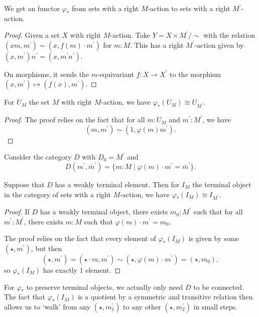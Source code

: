 \begin{lemma}\label{lem:scalar-extension}
  We get an  functor $ \varphi_* $ from sets with a right $ M $-action to sets with a right $ M^\prime $-action.
\end{lemma}
\begin{proof}
  Given a set $ X $ with right $ M $-action. Take $ Y = X \times M^\prime / \sim $ with the relation $ (x m, m^\prime) \sim (x, f(m) \cdot m^\prime) $ for $ m: M $. This has a right $ M^\prime $-action given by $ (x, m^\prime)n^\prime = (x, m^\prime n^\prime) $.

  On morphisms, it sends the $ m $-equivariant $ f: X \to X^\prime $ to the morphism $ (x, m^\prime) \mapsto (f(x), m^\prime) $.
\end{proof}

\begin{lemma}\label{lem:scalar-extension-monoid-monoid-action}
  For $ U_M $ the set $ M $ with right $ M $-action, we have $ \varphi_*(U_M) \cong U_{M^\prime} $.
\end{lemma}
\begin{proof}
  The proof relies on the fact that for all $ m: U_M $ and $ m^\prime : M^\prime $, we have
  \[ (m, m^\prime) \sim (1, \varphi(m) m^\prime). \]
\end{proof}

Consider the category $ D $ with $ D_0 = M^\prime $ and
\[ D(m^\prime, \overline m^\prime) = \{ m: M \mid \varphi(m) \cdot m^\prime = \overline m^\prime \}. \]

\begin{lemma}\label{lem:scalar-extension-terminal}
  Suppose that $ D $ has a weakly terminal element. Then for $ I_M $ the terminal object in the category of sets with a right $ M $-action, we have $ \varphi_*(I_M) \cong I_{M^\prime} $.
\end{lemma}
\begin{proof}
  If $ D $ has a weakly terminal object, there exists $ m_0 : M^\prime $ such that for all $ m^\prime: M^\prime $, there exists $ m: M $ such that $ \varphi(m) \cdot m^\prime = m_0 $.

  The proof relies on the fact that every element of $ \varphi_*(I_M) $ is given by some $ (\star, m^\prime) $, but then
  \[ (\star, m^\prime) = (\star \cdot m, m^\prime) \sim (\star, \varphi(m) \cdot m^\prime) = (\star, m_0), \]
  so $ \varphi_*(I_M) $ has exactly $ 1 $ element.
\end{proof}

\begin{remark}
  For $ \varphi_* $ to preserve terminal objects, we actually only need $ D $ to be connected. The fact that $ \varphi_*(I_M) $ is a quotient by a symmetric and transitive relation then allows us to `walk' from any $ (\star, m^\prime_1) $ to any other $ (\star, m^\prime_2) $ in small steps.
\end{remark}

